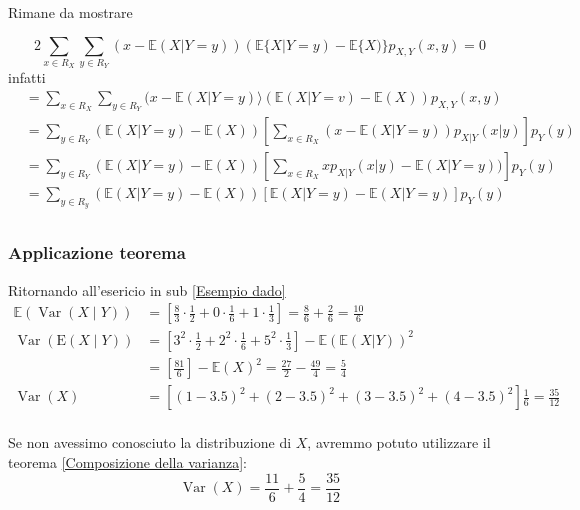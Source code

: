 Rimane da mostrare

\[
	2 \sum_{x \in R_X} \sum_{y \in R_Y}(x-\mathbb{E}(X | Y=y))(\mathbb{E}\{X | Y=y)-\mathbb{E}\{X)\} p_{X, Y}(x, y)=0
\]
infatti
\begin{align*}
	 & =\sum_{ x \in R_X} \sum_{y \in R_Y}(x-\mathbb{E}(X | Y=y)\rangle(\mathbb{E}(X | Y=v)-\mathbb{E}(X))p_{X, Y}\left(x, y\right)                             \\
	 & =\sum_{y \in R_Y}\left(\mathbb{E}(X | Y=y) -\mathbb{E}(X)\right)\left[\sum_{x \in R_X}(x-\mathbb{E}(X | Y=y)) p _{ X | Y}(x | y)\right] p_Y(y)           \\
	 & =\sum_{y \in R_Y}\left(\mathbb{E}(X | Y=y) -\mathbb{E}(X)\right)\left[\sum_{x \in R_X}x  p_{X | Y}\left(x|y\right) - \mathbb{E}(X | Y=y)) \right] p_Y(y) \\
	 & =\sum_{y \in R_y}(\mathbb{E}(X | Y=y)-\mathbb{E}(X))\left[\mathbb{E}(X | Y=y)-\mathbb{E}(X | Y=y)\right]  p_Y(y)                                         \\
\end{align*}
\subsubsection*{Applicazione teorema}
Ritornando all'esericio in sub \ref{Esempio dado}
\begin{align*}
	\mathbb{E}(\operatorname{Var}(X \mid Y)) & =\left[\frac{8}{3} \cdot  \frac{1}{2}+ 0 \cdot \frac{1}{6}+1 \cdot \frac{1}{3}\right]=\frac{8}{6}+\frac{2}{6}=\frac{10}{6}                     \\
	\operatorname{Var}(\mathrm{E}(X \mid Y)) & = \left[3^2  \cdot \frac{1}{2} + 2^2  \cdot \frac{1}{6} + 5^2  \cdot \frac{1}{3}\right] - \mathbb{E} \left(\mathbb{E}\left(X|Y\right)\right)^2 \\
	                                         & = \left[\frac{81}{6}\right] - \mathbb{E} \left(X\right)^2  = \frac{27}{2} - \frac{49}{4} = \frac{5}{4}                                         \\
	\operatorname{Var}(X)                    & =\left[(1-3.5)^2+(2-3.5)^2+(3-3.5)^2+(4-3.5)^2\right]\frac{1}{6} = \frac{35}{12}                                                               \\
\end{align*}

Se non avessimo conosciuto la distribuzione di $ X $, avremmo potuto utilizzare il teorema \ref{Composizione della varianza}:
\[
	\operatorname{Var} \left(X\right) = \frac{11}{6} + \frac{5}{4}  = \frac{35}{12}
\]

